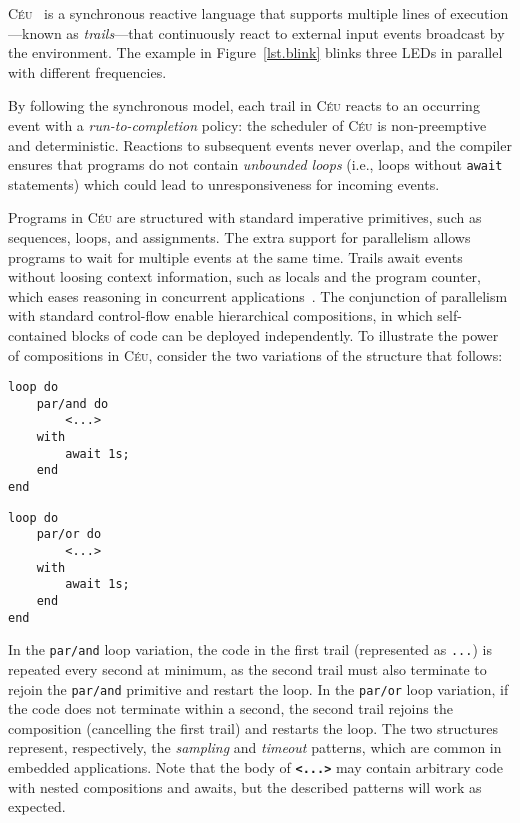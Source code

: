 \documentclass[pdftex,12pt,a4paper]{article}
\newcommand{\CEU}{\textsc{C\'{e}u}\xspace}
\newcommand{\code}[1] {{\small{\texttt{#1}}}}
\begin{document}
\CEU~\cite{ceu.sensys13,ceu.phd,ceu.rem13,ceu.tr} is a synchronous reactive 
language that supports multiple lines of execution---known as 
\emph{trails}---that continuously react to external input events broadcast by 
the environment.
%
The example in Figure~\ref{lst.blink} blinks three LEDs in parallel with 
different frequencies.

By following the synchronous model, each trail in \CEU reacts to an occurring 
event with a \emph{run-to-completion} policy: the scheduler of \CEU is 
non-preemptive and deterministic.
%
Reactions to subsequent events never overlap, and the compiler ensures that 
programs do not contain \emph{unbounded loops} (i.e., loops without 
\code{await} statements) which could lead to unresponsiveness for incoming 
events.
%

Programs in \CEU are structured with standard imperative primitives, such as 
sequences, loops, and assignments.
The extra support for parallelism allows programs to wait for multiple events 
at the same time.
Trails await events without loosing context information, such as locals and the 
program counter, which eases reasoning in concurrent 
applications~\cite{sync_async.cooperative}.
%
The conjunction of parallelism with standard control-flow enable hierarchical 
compositions, in which self-contained blocks of code can be deployed 
independently.
%
To illustrate the power of compositions in \CEU, consider the two variations of 
the structure that follows:

\begin{minipage}[t]{0.35\linewidth}
\begin{lstlisting}
loop do
    par/and do
        <...>
    with
        await 1s;
    end
end
\end{lstlisting}
\end{minipage}
%
\hspace{1cm}
%
\begin{minipage}[t]{0.35\linewidth}
\begin{lstlisting}
loop do
    par/or do
        <...>
    with
        await 1s;
    end
end
\end{lstlisting}
\end{minipage}

In the \code{par/and} loop variation, the code in the first trail (represented 
as \code{...}) is repeated every second at minimum, as the second trail must 
also terminate to rejoin the \code{par/and} primitive and restart the loop.
%
In the \code{par/or} loop variation, if the code does not terminate within a 
second, the second trail rejoins the composition (cancelling the first trail) 
and restarts the loop.
%
The two structures represent, respectively, the \emph{sampling} and 
\emph{timeout} patterns, which are common in embedded applications.
%
Note that the body of \textbf{\code{<...>}} may contain arbitrary code with 
nested compositions and awaits, but the described patterns will work as 
expected.
\end{document}
